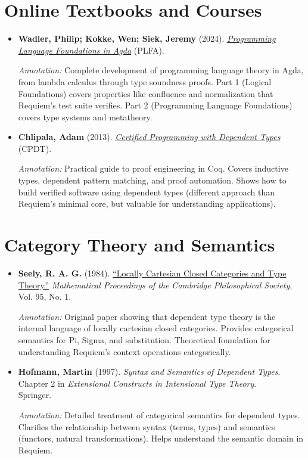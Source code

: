 \documentclass[11pt]{article}
\begin{document}
\section{Online Textbooks and Courses}

\begin{itemize}[leftmargin=*]
\item \textbf{Wadler, Philip; Kokke, Wen; Siek, Jeremy} (2024). \href{https://plfa.github.io/}{\emph{Programming Language Foundations in Agda}} (PLFA).

\textit{Annotation:} Complete development of programming language theory in Agda, from lambda calculus through type soundness proofs. Part 1 (Logical Foundations) covers properties like confluence and normalization that Requiem's test suite verifies. Part 2 (Programming Language Foundations) covers type systems and metatheory.

\item \textbf{Chlipala, Adam} (2013). \href{http://adam.chlipala.net/cpdt/}{\emph{Certified Programming with Dependent Types}} (CPDT).

\textit{Annotation:} Practical guide to proof engineering in Coq. Covers inductive types, dependent pattern matching, and proof automation. Shows how to build verified software using dependent types (different approach than Requiem's minimal core, but valuable for understanding applications).

\end{itemize}

\section{Category Theory and Semantics}

\begin{itemize}[leftmargin=*]
\item \textbf{Seely, R. A. G.} (1984). \href{https://www.math.mcgill.ca/rags/LCCC/LCCC.pdf}{``Locally Cartesian Closed Categories and Type Theory.''} \emph{Mathematical Proceedings of the Cambridge Philosophical Society}, Vol. 95, No. 1.

\textit{Annotation:} Original paper showing that dependent type theory is the internal language of locally cartesian closed categories. Provides categorical semantics for Pi, Sigma, and substitution. Theoretical foundation for understanding Requiem's context operations categorically.

\item \textbf{Hofmann, Martin} (1997). \emph{Syntax and Semantics of Dependent Types}. Chapter 2 in \emph{Extensional Constructs in Intensional Type Theory}.\\
Springer.

\textit{Annotation:} Detailed treatment of categorical semantics for dependent types. Clarifies the relationship between syntax (terms, types) and semantics (functors, natural transformations). Helps understand the semantic domain in Requiem.

\end{itemize}
\end{document}
